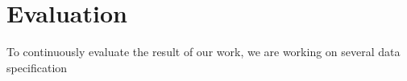 \chapter{Evaluation}
\label{chapters:evaluation}



To continuously evaluate the result of our work, we are working on several data specification


